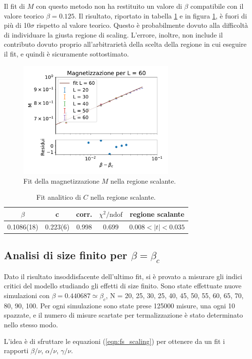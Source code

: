 \documentclass[a4paper,11pt]{article}
\newcommand{\chindof}{\chi^2 / \text{ndof}}
\begin{document}
	Il fit di $M$ con questo metodo non ha restituito un valore di $\beta$ compatibile con il valore teorico $\beta = 0.125$. Il risultato, riportato in tabella \ref{tab:M_fit} e in figura \ref{fig:M_fit}, è fuori di più di 10$\sigma$ rispetto al valore teorico. Questo è probabilmente dovuto alla difficoltà di individuare la giusta regione di scaling. L'errore, inoltre, non include il contributo dovuto proprio all'arbitrarietà della scelta della regione in cui eseguire il fit, e quindi è sicuramente sottostimato.
	
	\begin{figure}[htb]
        \centering
        \includegraphics[width=0.7\textwidth]{figure/m_fit.pdf}
        \caption{Fit della magnetizzazione $M$ nella regione scalante.}
        \label{fig:M_fit}
	\end{figure}
	
	\begin{table}[htb]
       \centering
        \begin{tabular}{c c c c c } \hline 
                $\beta$  & c    & corr. & $\chindof$ & regione scalante \\ \hline
                0.1086(18) & 0.223(6)   & 0.998   & 0.699 & $0.008 < |t| < 0.035$ \\ \hline
        \end{tabular}
        \caption{Fit analitico di $C$ nella regione scalante.}
        \label{tab:M_fit}
	\end{table}

	\subsection{Analisi di size finito per $\beta = \beta_c$}

	Dato il risultato insoddisfacente dell'ultimo fit, si è provato a misurare gli indici critici del modello studiando gli effetti di size finito. Sono state effettuate nuove simulazioni con $\beta = 0.440687 \simeq \beta_c$, N = 20, 25, 30, 25, 40, 45, 50, 55, 60, 65, 70, 80, 90, 100. Per ogni simulazione sono state prese 125000 misure, una ogni 10 spazzate, e il numero di misure scartate per termalizzazione è stato determinato nello stesso modo.
	
	L'idea è di sfruttare le equazioni (\ref{eqn:fs_scaling}) per ottenere da un fit i rapporti $\beta / \nu$, $\alpha / \nu$, $\gamma / \nu$.
	
	
\end{document}
